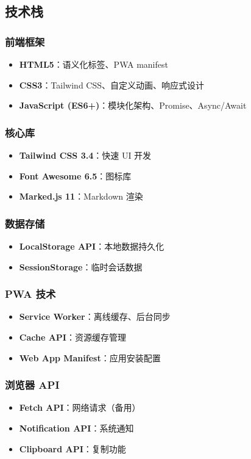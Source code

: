 \documentclass[12pt,a4paper]{article}
\begin{document}
\subsection{技术栈}

\subsubsection{前端框架}
\begin{itemize}
    \item \textbf{HTML5}：语义化标签、PWA manifest
    \item \textbf{CSS3}：Tailwind CSS、自定义动画、响应式设计
    \item \textbf{JavaScript (ES6+)}：模块化架构、Promise、Async/Await
\end{itemize}

\subsubsection{核心库}
\begin{itemize}
    \item \textbf{Tailwind CSS 3.4}：快速 UI 开发
    \item \textbf{Font Awesome 6.5}：图标库
    \item \textbf{Marked.js 11}：Markdown 渲染
\end{itemize}

\subsubsection{数据存储}
\begin{itemize}
    \item \textbf{LocalStorage API}：本地数据持久化
    \item \textbf{SessionStorage}：临时会话数据
\end{itemize}

\subsubsection{PWA 技术}
\begin{itemize}
    \item \textbf{Service Worker}：离线缓存、后台同步
    \item \textbf{Cache API}：资源缓存管理
    \item \textbf{Web App Manifest}：应用安装配置
\end{itemize}

\subsubsection{浏览器 API}
\begin{itemize}
    \item \textbf{Fetch API}：网络请求（备用）
    \item \textbf{Notification API}：系统通知
    \item \textbf{Clipboard API}：复制功能
\end{itemize}
\end{document}
